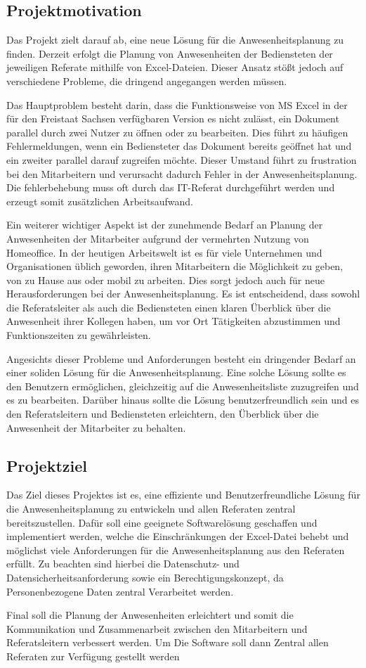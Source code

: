 \subsection{Projektmotivation}
\label{sec:Projektmotivation}
Das Projekt zielt darauf ab, eine neue Lösung für die Anwesenheitsplanung zu finden. Derzeit erfolgt die Planung von Anwesenheiten der Bediensteten der jeweiligen Referate mithilfe von Excel-Dateien. Dieser Ansatz stößt jedoch auf verschiedene Probleme, die dringend angegangen werden müssen.

Das Hauptproblem besteht darin, dass die Funktionsweise von MS Excel in der für den Freistaat Sachsen verfügbaren Version es nicht zulässt, ein Dokument parallel durch zwei Nutzer zu öffnen oder zu bearbeiten. Dies führt zu häufigen Fehlermeldungen, wenn ein Bediensteter das Dokument bereits geöffnet hat und ein zweiter parallel darauf zugreifen möchte. Dieser Umstand führt zu frustration bei den Mitarbeitern und verursacht dadurch Fehler in der Anwesenheitsplanung. Die fehlerbehebung muss oft durch das IT-Referat durchgeführt werden und erzeugt somit zusätzlichen Arbeitsaufwand.

Ein weiterer wichtiger Aspekt ist der zunehmende Bedarf an Planung der Anwesenheiten der Mitarbeiter aufgrund der vermehrten Nutzung von Homeoffice. In der heutigen Arbeitswelt ist es für viele Unternehmen und Organisationen üblich geworden, ihren Mitarbeitern die Möglichkeit zu geben, von zu Hause aus oder mobil zu arbeiten. Dies sorgt jedoch auch für neue Herausforderungen bei der Anwesenheitsplanung. Es ist entscheidend, dass sowohl die Referatsleiter als auch die Bediensteten einen klaren Überblick über die Anwesenheit ihrer Kollegen haben, um vor Ort Tätigkeiten abzustimmen und \zB Funktionszeiten zu gewährleisten.

Angesichts dieser Probleme und Anforderungen besteht ein dringender Bedarf an einer soliden Lösung für die Anwesenheitsplanung. Eine solche Lösung sollte es den Benutzern ermöglichen, gleichzeitig auf die Anwesenheitsliste zuzugreifen und es zu bearbeiten. Darüber hinaus sollte die Lösung benutzerfreundlich sein und es den Referatsleitern und Bediensteten erleichtern, den Überblick über die Anwesenheit der Mitarbeiter zu behalten.


\subsection{Projektziel}
\label{sec:Projektziel}

Das Ziel dieses Projektes ist es, eine effiziente und Benutzerfreundliche Lösung für die Anwesenheitsplanung zu entwickeln und allen Referaten zentral bereitszustellen. Dafür soll eine geeignete Softwarelösung geschaffen und implementiert werden, welche die Einschränkungen der Excel-Datei behebt und möglichst viele Anforderungen für die Anwesenheitsplanung aus den Referaten erfüllt. Zu beachten sind hierbei die Datenschutz- und Datensicherheitsanforderung sowie ein Berechtigungskonzept, da Personenbezogene Daten zentral Verarbeitet werden.

Final soll die Planung der Anwesenheiten erleichtert und somit die Kommunikation und Zusammenarbeit zwischen den Mitarbeitern und Referatsleitern verbessert werden. Um  Die Software soll dann Zentral allen Referaten zur Verfügung gestellt werden
